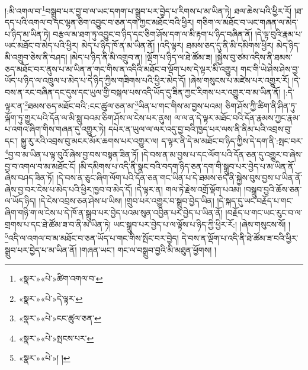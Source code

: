 །:མི་འགལ་བ་\footnote{«སྣར་»«པེ་»ཚིག་འགལ་བ་}བསྒྲུབ་པར་བྱ་བ་ལ་ཡང་དགག་པ་སྒྲུབ་པར་བྱེད་པ་རིགས་པ་མ་ཡིན་ཏེ། ཐལ་ཆེས་པའི་ཕྱིར་རོ། །ཐ་དད་པའི་འགལ་བ་དང་ལྷན་ཅིག་འབྱུང་བ་ཅན་དག་ཀྱང་མཐོང་བའི་ཕྱིར། གཅིག་ལ་མཐོང་བ་ཡང་གཞན་ལ་མེད་པ་ཉིད་མ་ཡིན་ཏེ། བརྩལ་མ་ཐག་ཏུ་འབྱུང་བ་ཉིད་དང་ཅིག་ཤོས་དག་ལ་མི་རྟག་པ་ཉིད་བཞིན་ནོ། །དེ་ལྟ་བུའི་རྣམ་པ་ཡང་མཐོང་བ་མེད་པའི་ཕྱིར། མེད་པ་ཉིད་ཁོ་ན་མ་ཡིན་ནོ། །འདི་ལྟར། ཐམས་ཅད་དུ་ནི་མི་དམིགས་ཕྱིར། མེད་ཉིད་མི་འགྲུབ་ཅེས་ནི་བཤད། །མེད་པ་ཉིད་ནི་མི་འགྲུབ་ན། །ལྡོག་པ་ཉིད་ལ་ཐེ་ཚོམ་ཟ། །སྐྱེས་བུ་ཙམ་འདིས་ནི་ཐམས་ཅད་མཐོང་བར་ནུས་པ་མ་ཡིན་ན་གང་གིས་ན་འདིའི་མཐོང་བ་ལྡོག་པས་དེ་ལྟར་མི་འགྱུར། གང་གི་ཡེ་ཤེས་ཤེས་བྱ་ཡོད་པ་ཉིད་ལ་འཁྲུལ་པ་མེད་པ་དེ་ཉིད་ཀྱིས་གཟིགས་པའི་ཕྱིར་མེད་དོ། །ཞེས་གསུངས་པ་མཛེས་པར་འགྱུར་རོ། །དེ་བས་ན་རང་བཞིན་དང་དུས་དང་ཡུལ་གྱི་བསྐལ་པས་འདི་ཡོད་དུ་ཟིན་ཀྱང་རིགས་པར་འགྱུར་བ་མ་ཡིན་ནོ། །:དེ་ལྟར་ན་\footnote{«སྣར་»«པེ་»དེ་ལྟར་}ཐམས་ཅད་མཐོང་བའི་:ངང་ཚུལ་ཅན་མ་\footnote{«སྣར་»«པེ་»ངང་ཚུལ་ཅན་}ཡིན་པ་གང་གིས་མ་བྱས་པའམ། ཅིག་ཤོས་ཀྱི་ཚིག་ནི་ཤིན་ཏུ་ལྐོག་ཏུ་གྱུར་པའི་དོན་ལ་མི་སླུ་བའམ་ཅིག་ཤོས་ལ་ངེས་པར་ནུས། ལ་ལ་ན་དེ་ལྟར་མཐོང་བའི་དོན་རྣམས་ཀྱང་རྣམ་པ་འགའ་ཞིག་གིས་གཞན་དུ་འགྱུར་ཏེ། དཔེར་ན་ཡུལ་ལ་ལར་འདུ་བྱ་བའི་ཁྱད་པར་ལས་ནི་ནིམ་པའི་འབྲས་བུ་དང་། སྐྱུ་རུ་རའི་འབྲས་བུ་མངར་མོར་ཆགས་པར་འགྱུར་ལ། ད་ལྟར་ནི་དེ་མ་མཐོང་བ་ཉིད་ཀྱིས་དེ་དག་ནི་:སྤང་བར་\footnote{«སྣར་»«པེ་»སྤངས་པར་}བྱ་བ་མ་ཡིན་པ་ལྟ་བུའོ་ཞེས་བྱ་བས་བསྟན་ཟིན་ཏོ། །དེ་བས་ན་མ་བྱས་པ་དང་ལོག་པའི་དོན་ཅན་དུ་འགྱུར་བ་ཞེས་བྱ་བ་འགལ་བ་མ་མཐོང་ངོ། །མི་དམིགས་པ་འདི་ནི་སྣང་བའི་བདག་ཉིད་ཅན་དག་གི་སྒྲུབ་པར་བྱེད་པ་མ་ཡིན་ནོ་ཞེས་བཤད་ཟིན་ཏོ། །དེ་བས་ན་ཅུང་ཞིག་ལོག་པའི་དོན་ཅན་གང་ཡིན་པ་དེ་ཐམས་ཅད་ནི་སྐྱེས་བུས་བྱས་པ་ཡིན་ནོ་ཞེས་བྱ་བར་ངེས་པ་མེད་པའི་ཕྱིར་ཁྱབ་བ་མེད་དོ། །དེ་ལྟར་ན། གལ་ཏེ་རྗེས་འགྲོ་ལྡོག་པའམ། །བསྒྲུབ་བྱའི་ཆོས་ཅན་ལ་ཡོད་ཉིད། །དེ་ངེས་འབྲས་ཅན་ཤེས་པ་ཡིས། །གྲུབ་པར་འགྱུར་བ་སྒྲུབ་བྱེད་ཡིན། །དེ་སྐད་དུ་ཡང་བརྗོད་པ་གང་ཞིག་གཉི་ག་ལ་ངེས་པ་དེ་ཁོ་ན་སྒྲུབ་པར་བྱེད་པའམ་སུན་འབྱིན་པར་བྱེད་པ་ཡིན་ནོ། །བརྗོད་པ་གང་ཡང་རུང་བ་ལ་གྲགས་པ་དང་ཐེ་ཚོམ་ཟ་བ་ནི་མ་ཡིན་ཏེ། ཡང་སྒྲུབ་པར་བྱེད་པ་ལ་ལྟོས་པ་ཉིད་ཀྱི་ཕྱིར་རོ:། །ཞེས་གསུངས་སོ། །\footnote{«སྣར་»«པེ་»། །}འདི་ལ་འགལ་བ་མ་མཐོང་བ་ཅན་ཡོད་པ་གང་གིས་སྤོང་བར་བྱེད། དེ་བས་ན་ལྡོག་པ་འདི་ནི་ཐེ་ཚོམ་ཟ་བའི་ཕྱིར་སྒྲུབ་པར་བྱེད་པ་མ་ཡིན་ནོ། །གཞན་ཡང་། གང་ལ་བསྒྲུབ་བྱའི་མི་མཐུན་ཕྱོགས། །
